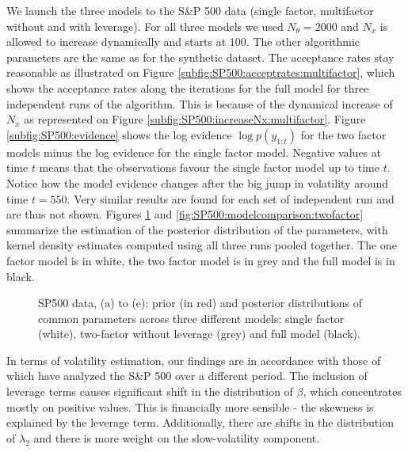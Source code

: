 \documentclass{statsoc}
\begin{document}
We launch the three models to the S\&P 500 data (single factor,
multifactor without and with leverage). For all three models we used
$N_\theta = 2000$ and $N_x$ is allowed to increase dynamically and starts at $100$.
The other algorithmic parameters are the same as for the synthetic dataset.
The acceptance rates stay reasonable as illustrated on Figure
\ref{subfig:SP500:acceptrates:multifactor}, which shows the acceptance rates
along the iterations for the full model for three independent runs of
the algorithm. This is because of the dynamical increase of $N_x$ as represented on Figure 
\ref{subfig:SP500:increaseNx:multifactor}.
Figure \ref{subfig:SP500:evidence} shows the log evidence $\log
p(y_{1:t})$ for the two factor models minus the log evidence for the single
factor model. Negative values at time $t$ means that the observations favour the
single factor model up to time $t$. Notice how the model evidence
changes after the big jump in volatility  around time $t = 550$. Very similar results
are found for each set of independent run and are thus not shown.
Figures \ref{fig:SP500:modelcomparison} and 
\ref{fig:SP500:modelcomparison:twofactor} summarize the estimation of the
posterior distribution of the parameters, with kernel density estimates computed
using all three runs pooled together. The one factor model is in white, the
two factor model is in grey and the full model is in black.  
\begin{figure}[H]
 \centering
 \caption{SP500 data, (a) to (e): prior (in red) and posterior distributions of common parameters across
three different models: single factor (white), two-factor without leverage (grey)
and full model (black). 
\label{fig:SP500:modelcomparison}}
\end{figure}

In terms of volatility estimation, our  findings are in accordance
with those of \cite{grif:steel:ou} 
which have analyzed the S\&P 500 over a different period. The
inclusion of leverage terms causes significant 
shift in the distribution of $\beta$, which concentrates mostly on
positive values. This is financially more sensible - the skewness is
explained by the leverage term.  Additionally, there are shifts in the
distribution of $\lambda_2$ and there is more weight on the
slow-volatility component. 
\end{document}
